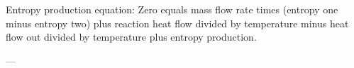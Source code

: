 Entropy production equation:  
Zero equals mass flow rate times (entropy one minus entropy two) plus reaction heat flow divided by temperature minus heat flow out divided by temperature plus entropy production.  

---